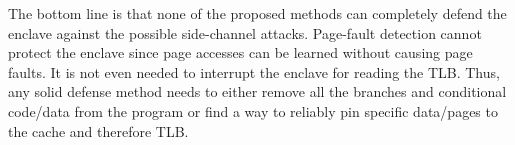 The bottom line is that none of the proposed methods can completely defend the enclave against the possible side-channel attacks. Page-fault detection cannot protect the enclave since page accesses can be learned without causing page faults. It is not even needed to interrupt the enclave for reading the TLB. Thus, any solid defense method needs to either remove all the branches and conditional code/data from the program or find a way to reliably pin specific data/pages to the cache and therefore TLB.

